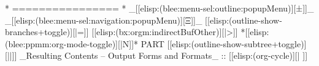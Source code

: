 \begin{whenOrg}


















\begin{whenOrg}
*      ================
*  _[[elisp:(blee:menu-sel:outline:popupMenu)][±]]_ _[[elisp:(blee:menu-sel:navigation:popupMenu)][Ξ]]_ [[elisp:(outline-show-branches+toggle)][|=]] [[elisp:(bx:orgm:indirectBufOther)][|>]] *[[elisp:(blee:ppmm:org-mode-toggle)][|N]]*  PART       [[elisp:(outline-show-subtree+toggle)][||]]   _Resulting Contents -- Output Forms and Formats_ ::  [[elisp:(org-cycle)][| ]]
\end{whenOrg}


\end{whenOrg}
